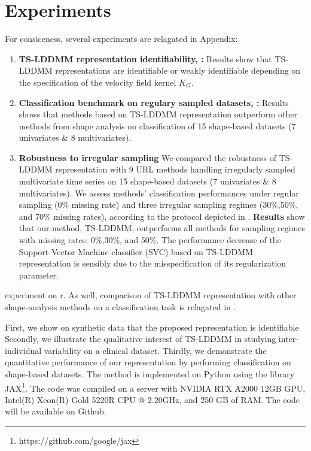 \section{Experiments}
\label{section:experiments}

For consiceness, several experiments are relagated in Appendix: 

\begin{enumerate}
    \item \textbf{TS-LDDMM representation identifiability, :} Results show that TS-LDDMM representations are identifiable or weakly identifiable depending on the specification of the velocity field kernel $K_G$.
    \item \textbf{Classification benchmark on regulary sampled datasets, :} Results shows that methods based on TS-LDDMM representation outperform other methods from shape analysis on classification of 15 shape-based datasets (7 univariates \& 8 multivariates).
    \item \textbf{Robustness to irregular sampling} We compared the robustness of TS-LDDMM representation with 9 URL methods handling irregularly sampled multivariate time series on 15 shape-based datasets (7 univariates \& 8 multivariates). We assess methods' classification performances under regular sampling (0\% missing rate) and three irregular sampling regimes (30\%,50\%, and 70\% missing rates), according to the protocol depicted in \cite{kidger2020neural}. \textbf{Results} show that our method, TS-LDDMM, outperforms all methods for sampling regimes with missing rates: 0\%,30\%, and 50\%. The performance decrease of the Support Vector Machine classifier (SVC) based on TS-LDDMM representation is sensibly due to the misspecification of its regularization parameter.
\end{enumerate}

experiment on r.  As well, comparison of TS-LDDMM representation with other shape-analysis methods on a classification task is relagated in .

First, we show on synthetic data that the proposed representation is identifiable
 Secondly, we illustrate the qualitative interest of TS-LDDMM in studying inter-individual variability on a clinical dataset.
  Thirdly, we demonstrate the quantitative performance of our representation by performing classification on shape-based datasets.
  The method is implemented on Python using the library JAX\footnote{https://github.com/google/jax}. The code was compiled on a server with NVIDIA RTX A2000 12GB GPU, Intel(R) Xeon(R) Gold 5220R CPU @ 2.20GHz, and 250 GB of RAM. The code will be available on Github.


